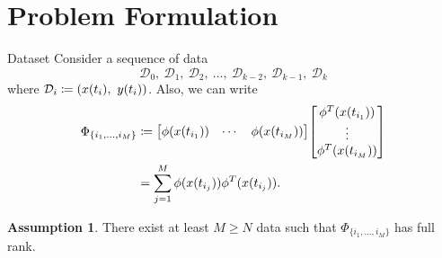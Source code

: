 \documentclass[handout]{beamer}
\theoremstyle{plain}
\theoremstyle{definition}
\newtheorem{assumption}{Assumption}
\theoremstyle{remark}
\newcommand{\MC}[1]{\mathcal{#1}}
\begin{document}
\section{Problem Formulation}

\begin{frame}{Dataset}
	Consider a sequence of data
	\begin{equation*}
		\MC{D}_0,\ \MC{D}_1,\ \MC{D}_2,\ \dotsc,\ \MC{D}_{k-2},\
		\MC{D}_{k-1},\ \MC{D}_k
	\end{equation*}
	where $\MC{D}_i \coloneqq \qty(x(t_i),\ y(t_i))$. Also, we can write
	\begin{align*}
		\Phi_{\{i_1,\dotsc,i_M\}}
		&\coloneqq \mqty[\phi(x(t_{i_1})) & \cdots & \phi(x(t_{i_M}))]
		\mqty[\phi^T(x(t_{i_1})) \\ \vdots \\ \phi^T(x(t_{i_M}))] \\
		&= \sum_{j=1}^M \phi(x(t_{i_j})) \phi^T(x(t_{i_j})).
	\end{align*}

	\begin{assumption}
		There exist at least $M \ge N$ data such that $\Phi_{\{i_1,\dotsc,i_M\}}$
		has full rank.
	\end{assumption}
\end{frame}
\end{document}
